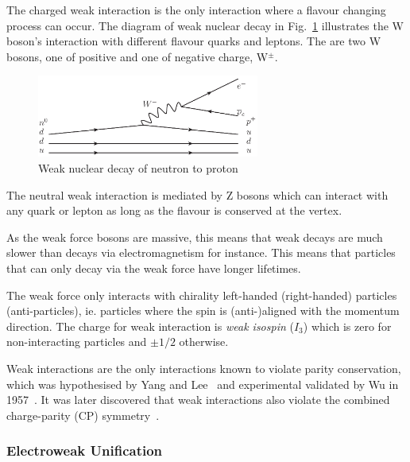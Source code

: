 The charged weak interaction is the only interaction where a flavour changing process can occur. The diagram of weak nuclear decay in Fig.~\ref{fig:QEDvertex} illustrates the W boson's interaction with different flavour quarks and leptons. The are two W bosons, one of positive and one of negative charge, W$^{\pm}$.


\begin{figure}[ht!]
\begin{center}
    \includegraphics[width=0.65\textwidth]{images/Theory/weakDecay.png}
    \caption{Weak nuclear decay of neutron to proton}
    \label{fig:QEDvertex}
\end{center}
\end{figure}

The neutral weak interaction is mediated by Z bosons which can interact with any quark or lepton as long as the flavour is conserved at the vertex.

As the weak force bosons are massive, this means that weak decays are much slower than decays via electromagnetism for instance. This means that particles that can only decay via the weak force have longer lifetimes. 

The weak force only interacts with chirality left-handed (right-handed) particles (anti-particles), ie. particles where the spin is (anti-)aligned with the momentum direction. The charge for weak interaction is \emph{weak isospin} ($I_{3}$) which is zero for non-interacting particles and $\pm1/2$ otherwise.

Weak interactions are the only interactions known to violate parity conservation, which was hypothesised by Yang and Lee~\cite{PhysRev.104.254} and experimental validated by Wu in 1957~\cite{PhysRev.105.1413}. It was later discovered that weak interactions also violate the combined charge-parity (CP) symmetry~\cite{Cronin2012,PhysRevLett.13.138}.

\subsubsection{Electroweak Unification}


